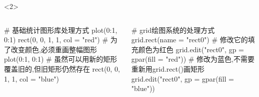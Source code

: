 \begin{frame}[t,fragile]{\subsecname}{}
\begin{overlayarea}{\textwidth}{\textheight}
\begin{onlyenv}<2>
\begin{columns}
  \begin{column}[t]{.5\textwidth}
    \begin{rcode}
# 基础统计图形库处理方式
plot(0:1, 0:1)
rect(0, 0, 1, 1, col = "red")
# 为了改变颜色,必须重画整幅图形
plot(0:1, 0:1)
# 虽然可以用新的矩形覆盖旧的,但旧矩形仍然存在
rect(0, 0, 1, 1, col = "blue")
    \end{rcode} 
  \end{column}

  \begin{column}[t]{.5\textwidth}
    \begin{rcode}
# grid绘图系统的处理方式
grid.rect(name = "rect0")
# 修改它的填充颜色为红色
grid.edit("rect0", gp = gpar(fill = "red"))
# 修改为蓝色,不需要重新用grid.rect()画矩形
grid.edit("rect0", gp = gpar(fill = "blue"))
    \end{rcode} 
  \end{column}
\end{columns} 
\end{onlyenv}

\end{overlayarea}
\end{frame} 

